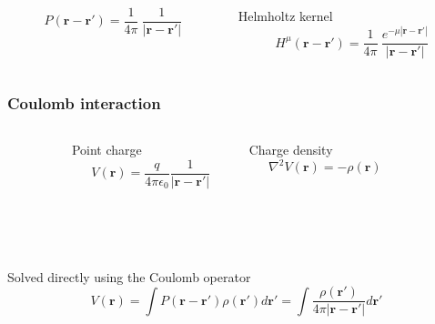 \documentclass[mathserif, 10pt]{beamer}
\begin{document}
\begin{frame}
\begin{columns}
\begin{column}{.48\textwidth}
\begin{equation}
	\nonumber
	P(\boldsymbol{r}-\boldsymbol{r}') = 
	    \frac{1}{4\pi}\ \frac{1}{|\boldsymbol{r}-\boldsymbol{r}'|}
    \end{equation}
    \end{column}
    \begin{column}{.48\textwidth}
    \centering
    Helmholtz kernel
    \begin{equation}
	\nonumber
	H^{\mu}(\boldsymbol{r}-\boldsymbol{r}') = \frac{1}{4\pi}\ 
	    \frac{e^{-\mu |\boldsymbol{r}-\boldsymbol{r}'|}}{|\boldsymbol{r}-\boldsymbol{r}'|}
    \end{equation}
    \end{column}
    \end{columns}    
\end{frame}

\begin{frame}
    \frametitle{Coulomb interaction}
    \centering
    \begin{columns}
    \begin{column}{.10\textwidth}
    \ \\
    \end{column}
    \begin{column}{.40\textwidth}
    \centering
    Point charge
    \begin{equation}
    	\nonumber
    	V(\boldsymbol{r}) = \frac{q}{4\pi\epsilon_0}
    	\frac{1}{|\boldsymbol{r}-\boldsymbol{r}'|}
    \end{equation}
    \end{column}
    \begin{column}{.40\textwidth}
    \centering
    Charge density
    \begin{equation}
	\nonumber
    	\nabla^2 V(\boldsymbol{r}) = -\rho(\boldsymbol{r})
    \end{equation}
    \end{column}
    \begin{column}{.10\textwidth}
    \ \\
    \end{column}
    \end{columns}
    \ \\
    \ \\
    \ \\
    \pause
    Solved directly using the Coulomb operator
    \begin{equation}
	\nonumber
	V(\boldsymbol{r}) = 
	\int P(\boldsymbol{r}-\boldsymbol{r'})\rho(\boldsymbol{r'}) d\boldsymbol{r'} =
	\int\frac{\rho(\boldsymbol{r'})}{4\pi|\boldsymbol{r} - \boldsymbol{r'}|} d\boldsymbol{r'} 

\end{equation}
\end{frame}
\end{document}
